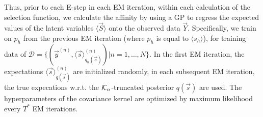 Thus, prior to each E-step in each EM iteration, within each calculation of the selection function, we calculate the affinity by using a GP to regress the expected values of the latent variables $\langle \vec{S} \rangle$ onto the observed data $\vec{Y}$.  
Specifically, we train on $p_h$ from the previous EM iteration (where $p_h$ is equal to $\langle s_h \rangle$), for 
training data of 
$\mathcal{D} = \{ (\vec{y}^{(n)}, \langle\vec{s}\rangle^{(n)}_{q_n(\vec{s})}) | n = 1,\dots, N \}$.
%
In the first EM iteration, the expectations $\langle\vec{s}\rangle^{(n)}_{q(\vec{s})}$ are initialized randomly, 
in each subsequent EM iteration, the true expecations w.r.t. the $\mathcal{K}_{n}$-truncated posterior $q(\vec{s})$ are used. 
The hyperparameters of the covariance kernel are optimized by maximum likelihood every $T^*$ EM iterations.

